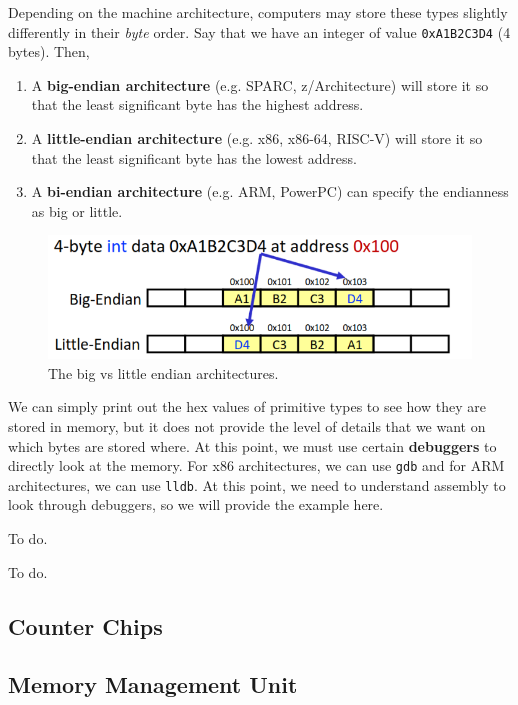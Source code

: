   \begin{definition}
    Depending on the machine architecture, computers may store these types slightly differently in their \textit{byte} order. Say that we have an integer of value \texttt{0xA1B2C3D4} (4 bytes). Then, 
    \begin{enumerate} 
      \item A \textbf{big-endian architecture} (e.g. SPARC, z/Architecture) will store it so that the least significant byte has the highest address.
      \item A \textbf{little-endian architecture} (e.g. x86, x86-64, RISC-V) will store it so that the least significant byte has the lowest address. 
      \item A \textbf{bi-endian architecture} (e.g. ARM, PowerPC) can specify the endianness as big or little. 
    \end{enumerate}

    \begin{figure}[H]
      \centering 
      \includegraphics[scale=0.4]{img/endianness.png}
      \caption{The big vs little endian architectures. } 
      \label{fig:endianness}
    \end{figure}
  \end{definition}

  We can simply print out the hex values of primitive types to see how they are stored in memory, but it does not provide the level of details that we want on which bytes are stored where. At this point, we must use certain \textbf{debuggers} to directly look at the memory. For x86 architectures, we can use \texttt{gdb} and for ARM architectures, we can use \texttt{lldb}. At this point, we need to understand assembly to look through debuggers, so we will provide the example here. 

  \begin{example}
    To do. 
  \end{example}

  \begin{example}
    To do. 
  \end{example}

\subsection{Counter Chips}

\subsection{Memory Management Unit}

